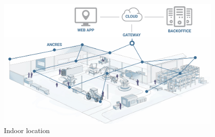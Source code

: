 \documentclass[\main/main.tex]{subfiles}
\begin{document}
\begin{figure}[H]
    \begin{center}
        \includegraphics[scale=0.3]{fonctionnement-technologie-mesh-wirepas.jpg}
    \end{center}
    \caption{Indoor location}
    \label{fig:indoor_location}
\end{figure}
\end{document}
